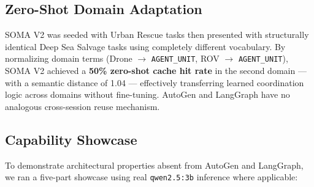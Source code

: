 \documentclass[conference]{IEEEtran}
\begin{document}
\subsection{Zero-Shot Domain Adaptation}

SOMA V2 was seeded with Urban Rescue tasks then presented with structurally identical
Deep Sea Salvage tasks using completely different vocabulary. By normalizing domain terms
(Drone $\rightarrow$ \texttt{AGENT\_UNIT}, ROV $\rightarrow$ \texttt{AGENT\_UNIT}),
SOMA V2 achieved a \textbf{50\% zero-shot cache hit rate} in the second domain --- with
a semantic distance of 1.04 --- effectively transferring learned coordination logic across
domains without fine-tuning. AutoGen and LangGraph have no analogous cross-session reuse
mechanism.

\subsection{Capability Showcase}
\label{sec:showcase}

To demonstrate architectural properties absent from AutoGen and LangGraph, we ran
a five-part showcase using real \texttt{qwen2.5:3b} inference where applicable:
\end{document}
